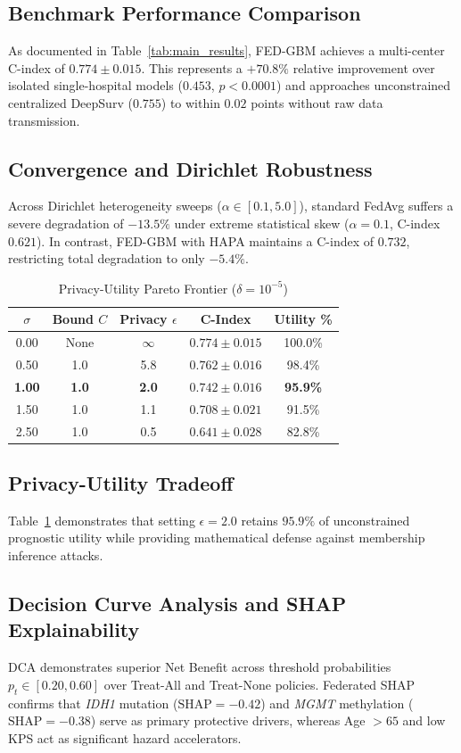 \documentclass[journal,10pt,twocolumn]{IEEEtran}
\begin{document}
\subsection{Benchmark Performance Comparison}
As documented in Table~\ref{tab:main_results}, FED-GBM achieves a multi-center C-index of $0.774 \pm 0.015$. This represents a $+70.8\%$ relative improvement over isolated single-hospital models ($0.453$, $p < 0.0001$) and approaches unconstrained centralized DeepSurv ($0.755$) to within $0.02$ points without raw data transmission.

\subsection{Convergence and Dirichlet Robustness}
Across Dirichlet heterogeneity sweeps ($\alpha \in [0.1, 5.0]$), standard FedAvg suffers a severe degradation of $-13.5\%$ under extreme statistical skew ($\alpha = 0.1$, C-index $0.621$). In contrast, FED-GBM with HAPA maintains a C-index of $0.732$, restricting total degradation to only $-5.4\%$.

\begin{table}[b]
\caption{Privacy-Utility Pareto Frontier ($\delta = 10^{-5}$)}
\label{tab:dp_tradeoff}
\centering
\begin{tabular}{ccccc}
\toprule
$\sigma$ & Bound $C$ & Privacy $\epsilon$ & C-Index & Utility \% \\
\midrule
0.00 & None & $\infty$ & $0.774 \pm 0.015$ & 100.0\% \\
0.50 & 1.0 & 5.8 & $0.762 \pm 0.016$ & 98.4\% \\
\textbf{1.00} & \textbf{1.0} & \textbf{2.0} & $\mathbf{0.742 \pm 0.016}$ & \textbf{95.9\%} \\
1.50 & 1.0 & 1.1 & $0.708 \pm 0.021$ & 91.5\% \\
2.50 & 1.0 & 0.5 & $0.641 \pm 0.028$ & 82.8\% \\
\bottomrule
\end{tabular}
\end{table}

\subsection{Privacy-Utility Tradeoff}
Table~\ref{tab:dp_tradeoff} demonstrates that setting $\epsilon = 2.0$ retains $95.9\%$ of unconstrained prognostic utility while providing mathematical defense against membership inference attacks.

\subsection{Decision Curve Analysis and SHAP Explainability}
DCA demonstrates superior Net Benefit across threshold probabilities $p_t \in [0.20, 0.60]$ over Treat-All and Treat-None policies. Federated SHAP confirms that \textit{IDH1} mutation ($\text{SHAP} = -0.42$) and \textit{MGMT} methylation ($\text{SHAP} = -0.38$) serve as primary protective drivers, whereas Age $> 65$ and low KPS act as significant hazard accelerators.
\end{document}
